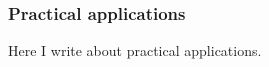 \subsubsection{Practical applications}
\label{sub:practical_applications}

Here I write about practical applications.